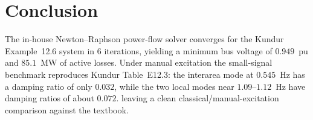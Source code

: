 \documentclass[12pt,a4paper]{article}
\begin{document}
\section{Conclusion}
\label{sec:concl}

The in-house Newton--Raphson power-flow solver converges for the Kundur
Example~12.6 system in $6$ iterations, yielding a minimum bus voltage of
$0.949$~pu and $85.1$~MW of active losses. Under manual excitation the
small-signal benchmark reproduces Kundur Table~E12.3: the interarea mode at
$0.545$~Hz has a damping ratio of only $0.032$, while the two local modes near
$1.09$--$1.12$~Hz have damping ratios of about $0.072$.
leaving a clean classical/manual-excitation comparison against the textbook.
\end{document}
